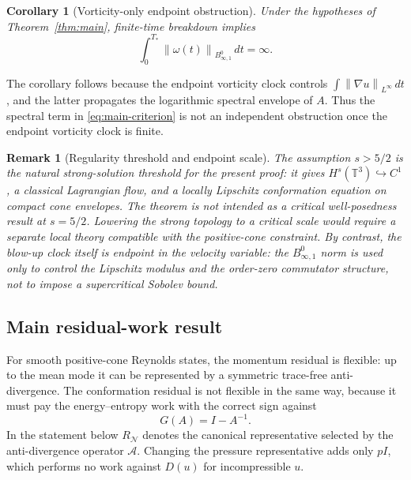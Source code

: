 \documentclass[11pt]{article}
\numberwithin{equation}{section}
\newtheorem{corollary}[theorem]{Corollary}
\newtheorem{remark}[theorem]{Remark}
\newcommand{\T}{\mathbb T}
\newcommand{\Id}{I}
\newcommand{\Besov}{B^0_{\infty,1}}
\newcommand{\calN}{\mathcal N}
\newcommand{\calA}{\mathcal A}
\newcommand{\norm}[1]{\left\lVert #1\right\rVert}
\begin{document}
\begin{corollary}[Vorticity-only endpoint obstruction]
\label{cor:vorticity-only}
Under the hypotheses of Theorem~\ref{thm:main}, finite-time breakdown implies
\[
  \int_0^{T_*}\norm{\omega(t)}_{\Besov}\,dt=\infty .
\]
\end{corollary}

The corollary follows because the endpoint vorticity clock controls
\(\int\norm{\nabla u}_{L^\infty}\,dt\), and the latter propagates the
logarithmic spectral envelope of \(A\).  Thus the spectral term in
\eqref{eq:main-criterion} is not an independent obstruction once the endpoint
vorticity clock is finite.

\begin{remark}[Regularity threshold and endpoint scale]
The assumption \(s>5/2\) is the natural strong-solution threshold for the
present proof: it gives \(H^s(\T^3)\hookrightarrow C^1\), a classical
Lagrangian flow, and a locally Lipschitz conformation equation on compact cone
envelopes.  The theorem is not intended as a critical well-posedness result at
\(s=5/2\).  Lowering the strong topology to a critical scale would require a
separate local theory compatible with the positive-cone constraint.  By
contrast, the blow-up clock itself is endpoint in the velocity variable: the
\(B^0_{\infty,1}\) norm is used only to control the Lipschitz modulus and the
order-zero commutator structure, not to impose a supercritical Sobolev bound.
\end{remark}

\subsection*{Main residual-work result}

For smooth positive-cone Reynolds states, the momentum residual is flexible:
up to the mean mode it can be represented by a symmetric trace-free
anti-divergence.  The conformation residual is not flexible in the same way,
because it must pay the energy--entropy work with the correct sign against
\[
  G(A)=\Id-A^{-1}.
\]
In the statement below \(R_{\calN}\) denotes the canonical representative
selected by the anti-divergence operator \(\calA\).  Changing the pressure
representative adds only \(p\Id\), which performs no work against \(D(u)\) for
incompressible \(u\).
\end{document}
